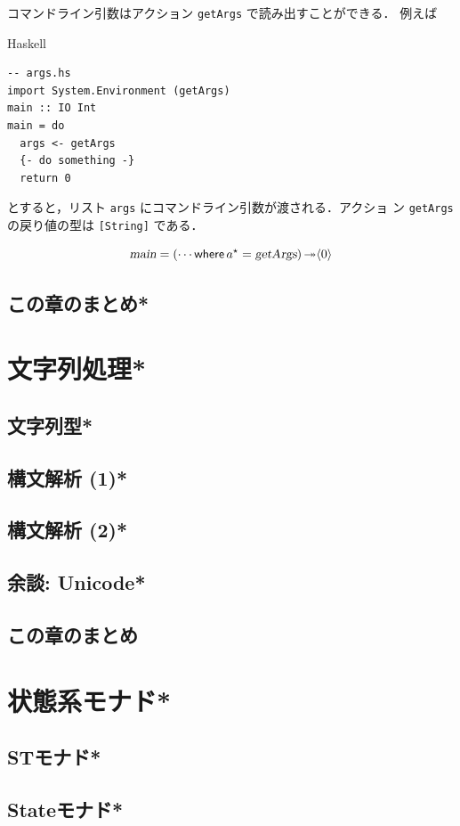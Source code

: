 \documentclass[a5paper,twoside,fleqn,draft]{jsbook}
\newcommand{\programminglanguage}[1]{\textsf{#1}}
\newcommand{\haskell}{\programminglanguage{Haskell}}
\newcommand{\code}[1]{\texttt{#1}}
\newenvironment{haskellcode}{\begin{itembox}[r]{\haskell}}{\end{itembox}}
\newcommand{\mKeyword}[1]{\mathsf{#1}}
\newcommand{\mWhereKeyword}{\mKeyword{where}}
\DeclareMathOperator{\mWhere}{\mWhereKeyword}
\newcommand{\mAction}[1]{\textsl{#1}}
\DeclareMathOperator{\mMain}{\mAction{main}}
\DeclareMathOperator{\mBindRightIgnore}{\twoheadrightarrow}
\newcommand{\mPureWith}[1]{\langle#1\rangle}
\newcommand{\mList}[1]{{#1}^\mathrm{\star}}
\begin{document}
コマンドライン引数はアクション \code{getArgs} で読み出すことができる．
例えば
\begin{haskellcode}
\begin{verbatim}
-- args.hs
import System.Environment (getArgs)
main :: IO Int
main = do
  args <- getArgs
  {- do something -}
  return 0
\end{verbatim}
\end{haskellcode}
とすると，リスト \code{args} にコマンドライン引数が渡される．アクショ
ン \code{getArgs} の戻り値の型は \code{[String]} である．

\begin{equation}
\mMain=(\dotsb\mWhere{}\mList{a}=\mAction{getArgs})\mBindRightIgnore\mPureWith{0}
\end{equation}

\section{この章のまとめ*}

\chapter{文字列処理*}
\section{文字列型*}
\section{構文解析 (1)*}
\section{構文解析 (2)*}
\section{余談: Unicode*}
\section{この章のまとめ}

\chapter{状態系モナド*}
\section{STモナド*}
\section{Stateモナド*}
\end{document}
